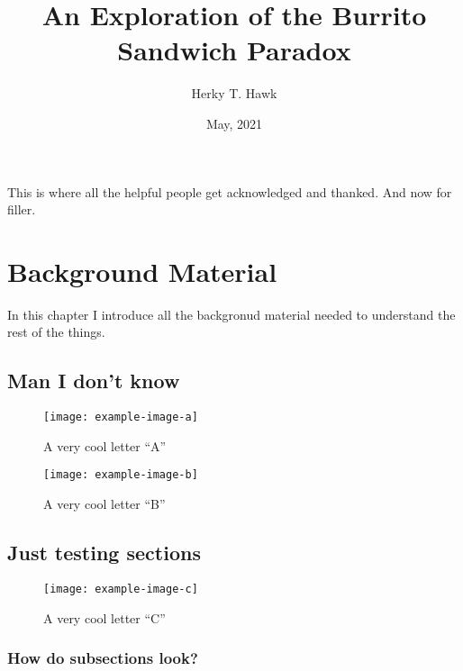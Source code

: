 \documentclass[letterpaper, openany, 12pt, oneside]{uithesis}
\title{An Exploration of the Burrito Sandwich Paradox}
\author{Herky T. Hawk}
\date{May, 2021}
\begin{document}
\titlepage

\copyrightPage

\frontmatter


\acknowledgments
This is where all the helpful people get acknowledged and thanked. And now for filler.

\lipsum[1]

\begin{publicAbstract}
	\lipsum[1-2]
\end{publicAbstract}

\begin{abstract}
	\lipsum[1-2]
\end{abstract}

\tableofcontents*

\listoffigures

\listoftables

\mainmatter

\chapter{Background Material}

In this chapter I introduce all the backgronud material needed to understand the
rest of the things.

\section{Man I don't know}
\begin{figure}
	\centering
	\label{fig:one}
	\caption{A very cool letter ``A''}
	\texttt{[image: example-image-a]}
\end{figure}
\lipsum[1-5]
\begin{figure}
	\centering
	\label{fig:two}
	\caption{A very cool letter ``B''}
	\texttt{[image: example-image-b]}
\end{figure}
\lipsum[6-10]

\section{Just testing sections}
\begin{figure}[!htb]
	\centering
	\label{fig:three}
	\caption{A very cool letter ``C''}
	\texttt{[image: example-image-c]}
\end{figure}
\lipsum[11-15]

\subsection{How do subsections look?}
\lipsum[75]
\end{document}
